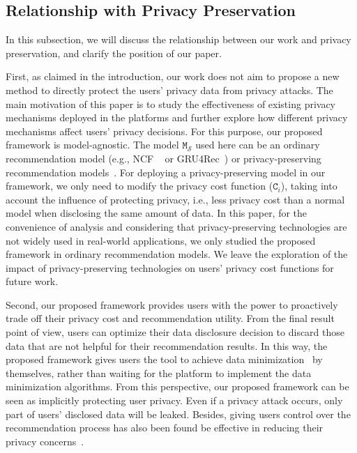 \subsection{Relationship with Privacy Preservation}


In this subsection, we will discuss the relationship between our work and privacy preservation, and clarify the position of our paper.

First, as claimed in the introduction, our work does not aim to propose a new method to directly protect the users' privacy data from privacy attacks.
The main motivation of this paper is to study the effectiveness of existing privacy mechanisms deployed in the platforms and further explore how different privacy mechanisms affect users' privacy decisions.
For this purpose, our proposed framework is model-agnostic.
The model $\texttt{M}_{\scriptscriptstyle \mathcal{S}}$ used here can be an ordinary recommendation model (e.g., NCF ~\cite{NCF} or GRU4Rec~\cite{Hidasi:ICLR2016:gru4rec}) or privacy-preserving recommendation models~\cite{Chen:TIST2020:Practical}.
For deploying a privacy-preserving model in our framework, we only need to modify the privacy cost function ($\texttt{C}_i$), taking into account the influence of protecting privacy, i.e., less privacy cost than a normal model when disclosing the same amount of data.
In this paper, for the convenience of analysis and considering that privacy-preserving technologies are not widely used in real-world applications, we only studied the proposed framework in ordinary recommendation models.
We leave the exploration of the impact of privacy-preserving technologies on users' privacy cost functions for future work. 

Second, our proposed framework provides users with the power to proactively trade off their privacy cost and recommendation utility.
From the final result point of view, users can optimize their data disclosure decision to discard those data that are not helpful for their recommendation results.
In this way, the proposed framework gives users the tool to achieve data minimization~\cite{Mireshghallah:WWW20:Not,biega2020operationalizing} by themselves, rather than waiting for the platform to implement the data minimization algorithms.
From this perspective, our proposed framework can be seen as  implicitly protecting user privacy.
Even if a privacy attack occurs, only part of users' disclosed data will be leaked.
Besides, giving users control over the recommendation process has also been found be effective in reducing their privacy concerns~\cite{Zhang2014-oa,Chen:CHI18:This}.
